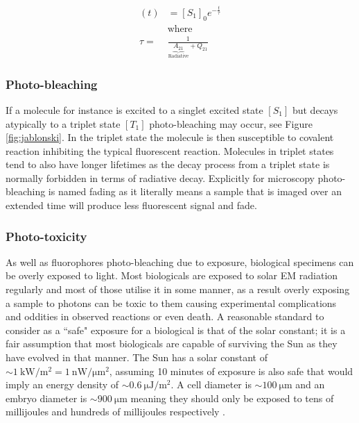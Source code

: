 \begin{align}
[S_1] (t) &= [S_1]_0 e^{-\frac{t}{\tau}}\label{eq:rateeq}\\
&\text{where}\nonumber\\
\tau = &\frac{1}{\underbrace{A_{21}}_{\text{Radiative}} + Q_{21}}
\end{align}

\subsubsection{Photo-bleaching} \label{sec:photobleaching}

If a molecule for instance is excited to a singlet excited state $[S_1]$ but decays atypically to a triplet state $[T_1]$ photo-bleaching may occur, see Figure \ref{fig:jablonski}. In the triplet state the molecule is then susceptible to covalent reaction inhibiting the typical fluorescent reaction.  Molecules in triplet states tend to also have longer lifetimes as the decay process from a triplet state is normally forbidden in terms of radiative decay. Explicitly for microscopy photo-bleaching is named fading as it literally means a sample that is imaged over an extended time will produce less fluorescent signal and fade.

\subsubsection{Photo-toxicity}

As well as fluorophores photo-bleaching due to exposure, biological specimens can be overly exposed to light. Most biologicals are exposed to solar EM radiation regularly and most of those utilise it in some manner, as a result overly exposing a sample to photons can be toxic to them causing experimental complications and oddities in observed reactions or even death. A reasonable standard to consider as a ``safe" exposure for a biological is that of the solar constant; it is a fair assumption that most biologicals are capable of surviving the Sun as they have evolved in that manner. The Sun has a solar constant of $\sim\SI{1}{\kilo\watt\per\meter\squared}= \SI{1}{\nano\watt\per\micro\meter\squared} $, assuming \SI{10}{} minutes of exposure is also safe that would imply an energy density of  $\sim \SI{0.6}{\micro\joule\per\meter\squared}$. A cell diameter is $\sim\SI{100}{\micro\meter}$ and an embryo diameter is $\sim \SI{900}{\micro\meter}$ meaning they should only be exposed to tens of millijoules and hundreds of millijoules respectively \cite{Stelzer2015}.

